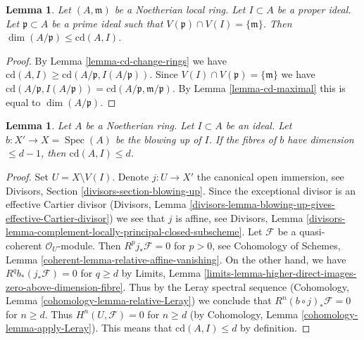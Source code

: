 \documentclass{stacks-project}
\theoremstyle{plain}
\newtheorem{lemma}[subsection]{Lemma}
\theoremstyle{definition}
\theoremstyle{remark}
\numberwithin{equation}{subsection}
\def\Spec{\mathop{\mathrm{Spec}}}
\begin{document}
\begin{lemma}
\label{lemma-cd-bound-dim-local}
Let $(A, \mathfrak m)$ be a Noetherian local ring.
Let $I \subset A$ be a proper ideal.
Let $\mathfrak p \subset A$ be a prime ideal
such that $V(\mathfrak p) \cap V(I) = \{\mathfrak m\}$.
Then $\dim(A/\mathfrak p) \leq \text{cd}(A, I)$.
\end{lemma}

\begin{proof}
By Lemma \ref{lemma-cd-change-rings} we have
$\text{cd}(A, I) \geq \text{cd}(A/\mathfrak p, I(A/\mathfrak p))$.
Since $V(I) \cap V(\mathfrak p) = \{\mathfrak m\}$ we have
$\text{cd}(A/\mathfrak p, I(A/\mathfrak p)) =
\text{cd}(A/\mathfrak p, \mathfrak m/\mathfrak p)$.
By Lemma \ref{lemma-cd-maximal} this is equal to $\dim(A/\mathfrak p)$.
\end{proof}

\begin{lemma}
\label{lemma-cd-blowup}
Let $A$ be a Noetherian ring. Let $I \subset A$ be an ideal.
Let $b : X' \to X = \Spec(A)$ be the blowing up of $I$.
If the fibres of $b$ have dimension $\leq d - 1$, then
$\text{cd}(A, I) \leq d$.
\end{lemma}

\begin{proof}
Set $U = X \setminus V(I)$. Denote $j : U \to X'$ the canonical open
immersion, see Divisors, Section \ref{divisors-section-blowing-up}.
Since the exceptional divisor is an effective Cartier divisor
(Divisors, Lemma
\ref{divisors-lemma-blowing-up-gives-effective-Cartier-divisor})
we see that $j$ is affine, see
Divisors, Lemma
\ref{divisors-lemma-complement-locally-principal-closed-subscheme}.
Let $\mathcal{F}$ be a quasi-coherent $\mathcal{O}_U$-module.
Then $R^pj_*\mathcal{F} = 0$ for $p > 0$, see
Cohomology of Schemes, Lemma
\ref{coherent-lemma-relative-affine-vanishing}.
On the other hand, we have $R^qb_*(j_*\mathcal{F}) = 0$ for
$q \geq d$ by Limits, Lemma
\ref{limits-lemma-higher-direct-images-zero-above-dimension-fibre}.
Thus by the Leray spectral sequence
(Cohomology, Lemma \ref{cohomology-lemma-relative-Leray})
we conclude that $R^n(b \circ j)_*\mathcal{F} = 0$ for
$n \geq d$. Thus $H^n(U, \mathcal{F}) = 0$ for $n \geq d$
(by Cohomology, Lemma \ref{cohomology-lemma-apply-Leray}).
This means that $\text{cd}(A, I) \leq d$ by definition.
\end{proof}
\end{document}
